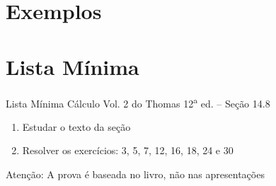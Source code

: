 \section{Exemplos}







\section{Lista Mínima}

\begin{frame}{Lista Mínima}
  Cálculo Vol. 2 do Thomas 12\textsuperscript{a} ed. -- Seção 14.8
  \begin{enumerate}
    \item Estudar o texto da seção
    \item Resolver os exercícios: 3, 5, 7, 12, 16, 18, 24 e 30
  \end{enumerate}

  \vfill
  Atenção: A prova é baseada no livro, não nas apresentações
\end{frame}


